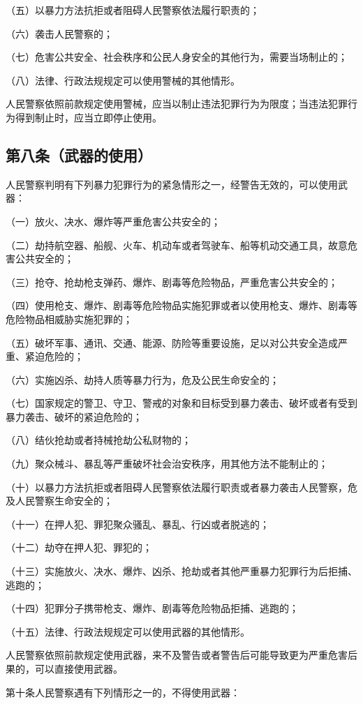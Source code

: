 \documentclass[utf-8,10pt]{ctexart}
\begin{document}
（五）以暴力方法抗拒或者阻碍人民警察依法履行职责的；

（六）袭击人民警察的；

（七）危害公共安全、社会秩序和公民人身安全的其他行为，需要当场制止的；

（八）法律、行政法规规定可以使用警械的其他情形。

人民警察依照前款规定使用警械，应当以制止违法犯罪行为为限度；当违法犯罪行为得到制止时，应当立即停止使用。
\subsection{第八条（武器的使用）}
人民警察判明有下列暴力犯罪行为的紧急情形之一，经警告无效的，可以使用武器：

（一）放火、决水、爆炸等严重危害公共安全的；

（二）劫持航空器、船舰、火车、机动车或者驾驶车、船等机动交通工具，故意危害公共安全的；

（三）抢夺、抢劫枪支弹药、爆炸、剧毒等危险物品，严重危害公共安全的；

（四）使用枪支、爆炸、剧毒等危险物品实施犯罪或者以使用枪支、爆炸、剧毒等危险物品相威胁实施犯罪的；

（五）破坏军事、通讯、交通、能源、防险等重要设施，足以对公共安全造成严重、紧迫危险的；

（六）实施凶杀、劫持人质等暴力行为，危及公民生命安全的；

（七）国家规定的警卫、守卫、警戒的对象和目标受到暴力袭击、破坏或者有受到暴力袭击、破坏的紧迫危险的；

（八）结伙抢劫或者持械抢劫公私财物的；

（九）聚众械斗、暴乱等严重破坏社会治安秩序，用其他方法不能制止的；

（十）以暴力方法抗拒或者阻碍人民警察依法履行职责或者暴力袭击人民警察，危及人民警察生命安全的；

（十一）在押人犯、罪犯聚众骚乱、暴乱、行凶或者脱逃的；

（十二）劫夺在押人犯、罪犯的；

（十三）实施放火、决水、爆炸、凶杀、抢劫或者其他严重暴力犯罪行为后拒捕、逃跑的；

（十四）犯罪分子携带枪支、爆炸、剧毒等危险物品拒捕、逃跑的；

（十五）法律、行政法规规定可以使用武器的其他情形。

人民警察依照前款规定使用武器，来不及警告或者警告后可能导致更为严重危害后果的，可以直接使用武器。

第十条人民警察遇有下列情形之一的，不得使用武器：
\end{document}

